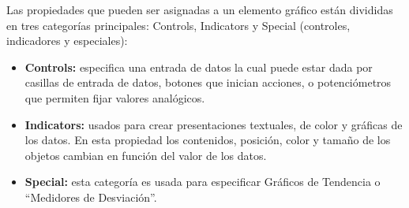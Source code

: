 Las propiedades que pueden ser asignadas a un elemento gráfico están divididas 
en tres categorías principales: Controls, Indicators y Special (controles, 
indicadores y especiales):
\begin{itemize}
\item  \textbf{Controls:} especifica una entrada de datos la cual puede estar
dada por
	casillas de entrada de datos, botones que inician acciones, o
	potenciómetros que permiten fijar valores analógicos.	
	
	
\item \textbf{Indicators:} usados para crear presentaciones textuales, de color
	y gráficas de los datos.
	En esta propiedad los contenidos, posición, color y
	tamaño de los objetos cambian en función del valor de los datos.
	
\item \textbf{Special:} esta categoría es usada para especificar Gráficos de
Tendencia o ``Medidores de Desviación''.
\end{itemize}
